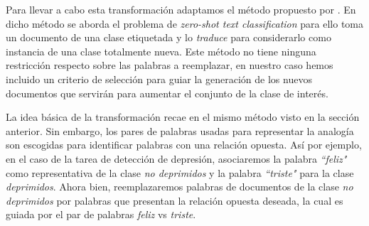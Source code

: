 Para llevar a cabo esta transformación adaptamos el método propuesto por \citep{zhang2019integrating}. En dicho método se aborda el problema de  \textit{zero-shot text classification} para ello toma un documento de una clase etiquetada y lo \textit{traduce} para considerarlo como instancia de una clase totalmente nueva. Este método no tiene ninguna restricción respecto sobre las palabras a reemplazar, en nuestro caso hemos incluido un criterio de selección para guiar la generación de los nuevos  documentos que servirán para aumentar el conjunto de la clase de interés.   

La idea básica de la transformación recae en el mismo método visto en la sección anterior. Sin embargo, los pares de palabras usadas para representar la analogía son escogidas para identificar palabras con una relación opuesta. Así por ejemplo, en el caso de la tarea de detección de depresión, asociaremos la palabra \textit{``feliz"} como representativa de la clase \textit{no deprimidos}  y la palabra \textit{``triste"}  para la clase \textit{deprimidos}. Ahora bien, reemplazaremos palabras de documentos de la clase \textit{no deprimidos} por palabras que presentan la relación opuesta deseada, la cual es guiada por el par de palabras \textit{feliz} vs \textit{triste}. 


